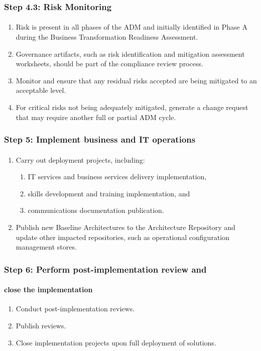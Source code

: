 \documentclass[aspectratio=169, table]{beamer}
\begin{document}
	\begin{frame}
		\frametitle{Step 4.3: Risk Monitoring}
		\framesubtitle{\hspace{1cm}}
		\vspace{20pt}
		\begin{enumerate}
			\item Risk is present in all phases of the ADM and initially identified in Phase A during the Business Transformation Readiness Assessment.
			\item Governance artifacts, such as risk identification and mitigation assessment worksheets, should be part of the compliance review process.
			\item Monitor and ensure that any residual risks accepted are being mitigated to an acceptable level.
			\item For critical risks not being adequately mitigated, generate a change request that may require another full or partial ADM cycle.
		\end{enumerate}
		
	\end{frame}

	
	\begin{frame}
		\frametitle{Step 5: Implement business and IT operations}
		\framesubtitle{\hspace{1cm}}
		\vspace{20pt}
		\begin{enumerate}
			\item Carry out deployment projects, including:
			\begin{enumerate}
				\item IT services and business services delivery implementation,
				\item skills development and training implementation, and 
				\item communications documentation publication.
			\end{enumerate}
			\item Publish new Baseline Architectures to the Architecture Repository and update other impacted repositories, such as operational configuration management stores.
		\end{enumerate}
	\end{frame}
	
	\begin{frame}
		\frametitle{Step 6: Perform post-implementation review and}
		\framesubtitle{close the implementation}
		\vspace{25pt}
		\begin{enumerate}
			\item Conduct post-implementation reviews.
			\item Publish reviews.
			\item Close implementation projects upon full deployment of solutions.
		\end{enumerate}
	\end{frame}
	
\end{document}
